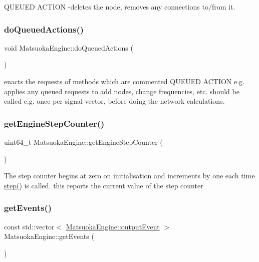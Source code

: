 Q\+U\+E\+U\+ED A\+C\+T\+I\+ON -\/deletes the node, removes any connections to/from it. 

\mbox{\label{classMatsuokaEngine_affd6ef89f68c1aa654229a07e0160f2e}} 
\subsubsection{\texorpdfstring{do\+Queued\+Actions()}{doQueuedActions()}}
{\footnotesize\ttfamily void Matsuoka\+Engine\+::do\+Queued\+Actions (\begin{DoxyParamCaption}{ }\end{DoxyParamCaption})}

enacts the requests of methods which are commented Q\+U\+E\+U\+ED A\+C\+T\+I\+ON e.\+g. applies any queued requests to add nodes, change frequencies, etc. should be called e.\+g. once per signal vector, before doing the network calculations. \mbox{\label{classMatsuokaEngine_a40114e7866da03ae1b7f37bcbde09876}} 
\subsubsection{\texorpdfstring{get\+Engine\+Step\+Counter()}{getEngineStepCounter()}}
{\footnotesize\ttfamily uint64\+\_\+t Matsuoka\+Engine\+::get\+Engine\+Step\+Counter (\begin{DoxyParamCaption}{ }\end{DoxyParamCaption})}

The step counter begins at zero on initialisation and increments by one each time \mbox{\hyperlink{classMatsuokaEngine_a4fa468dc0814f1ad92594f7a4d5abd00}{step()}} is called. this reports the current value of the step counter \mbox{\label{classMatsuokaEngine_a70444163eee59d0df5b282bb8696f5a1}} 
\subsubsection{\texorpdfstring{get\+Events()}{getEvents()}}
{\footnotesize\ttfamily const std\+::vector$<$ \mbox{\hyperlink{classMatsuokaEngine_a09035e4918ce82c9378821c88375f843}{Matsuoka\+Engine\+::output\+Event}} $>$ Matsuoka\+Engine\+::get\+Events (\begin{DoxyParamCaption}{ }\end{DoxyParamCaption})}



